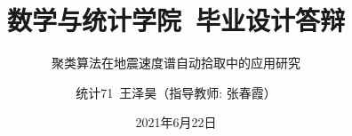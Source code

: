 
\usepackage{longtable}
\usepackage[backend=biber,
style=gb7714-2015, 
gbnamefmt=lowercase, 
maxcitenames=2,
mincitenames=1, 
gbcitelocal=gb7714-2015,
gbpub=false,
doi=false,
isbn=false,
url=false,
eprint=false]{biblatex}

\hypersetup{pdfpagemode=FullScreen}

\usepackage[fontset = none]{ctex}
\setsansfont{Source Han Serif SC}
\usepackage[ruled, boxed]{algorithm2e}
\usepackage{graphicx}
\usepackage{amsmath}
\usepackage{amsfonts}
\usepackage{subfigure}
\usepackage{url}

\author{统计71~王泽昊（指导教师: 张春霞）}

\date{2021年6月22日}

\title{数学与统计学院~毕业设计答辩}
\subtitle[本科毕业设计]{聚类算法在地震速度谱自动拾取中的应用研究}

\graphicspath{{images/}}
